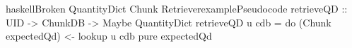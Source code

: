 \begin{pseudocode}{haskell}{Broken QuantityDict Chunk Retriever}{examplePseudocode}
retrieveQD :: UID -> ChunkDB -> Maybe QuantityDict
retrieveQD u cdb = do
    (Chunk expectedQd) <- lookup u cdb
    pure expectedQd
\end{pseudocode}
